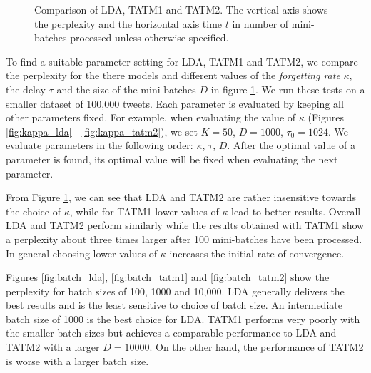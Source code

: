 \begin{figure}[ht]
{	\label{fig:batch_tatm2}
}
\caption[Optional caption for list of figures]{Comparison of LDA, TATM1 and TATM2. The vertical axis shows the perplexity and the horizontal axis time $t$ in number of mini-batches processed unless otherwise specified.}
\label{fig:evaluation}
\end{figure}
%
To find a suitable parameter setting for LDA, TATM1 and TATM2, we compare the perplexity for the there models and different values of the \textit{forgetting rate} $\kappa$, the delay $\tau$ and the size of the mini-batches $D$ in figure \ref{fig:evaluation}. We run these tests on a smaller dataset of 100,000 tweets. Each parameter is evaluated by keeping all other parameters fixed. For example, when evaluating the value of $\kappa$ (Figures \ref{fig:kappa_lda} - \ref{fig:kappa_tatm2}), we set $K=50$, $D=1000$, $\tau_0=1024$. We evaluate parameters in the following order: $\kappa$, $\tau$, $D$. After the optimal value of a parameter is found, its optimal value will be fixed when evaluating the next parameter.

From Figure \ref{fig:evaluation}, we can see that LDA and TATM2 are rather insensitive towards the choice of $\kappa$, while for TATM1 lower values of $\kappa$ lead to better results. Overall LDA and TATM2 perform similarly while the results obtained with TATM1 show a perplexity about three times larger after 100 mini-batches have been processed. In general choosing lower values of $\kappa$ increases the initial rate of convergence.

Figures \ref{fig:batch_lda}, \ref{fig:batch_tatm1} and \ref{fig:batch_tatm2} show the perplexity for batch sizes of 100, 1000 and 10,000. LDA generally delivers the best results and is the least sensitive to choice of batch size. An intermediate batch size of 1000 is the best choice for LDA. TATM1 performs very poorly with the smaller batch sizes but achieves a comparable performance to LDA and TATM2 with a larger $D=10000$. On the other hand, the performance of TATM2 is worse with a larger batch size.

